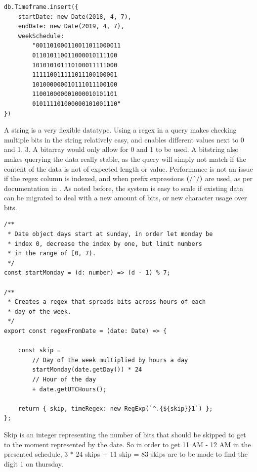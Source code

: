 \begin{center}
	\noindent\begin{minipage}{.45\textwidth}
		\begin{lstlisting}[caption={Improved timeframe.}, label={lst:new-timeframe}]
db.Timeframe.insert({
	startDate: new Date(2018, 4, 7),
	endDate: new Date(2019, 4, 7),
	weekSchedule:
		"001101000110011011000011
		011010110011000010111100
		101010101110100011111000
		111110011111011100100001
		101000000010111011100100
		110010000001000010101101
		010111101000000101001110"
})
\end{lstlisting}
	\end{minipage}
\end{center}

A string is a very flexible datatype. Using a regex in a query makes checking multiple bits in the string relatively easy, and enables different values next to 0 and 1. 3. A bitarray would only allow for 0 and 1 to be used. A bitstring also makes querying the data really stable, as the query will simply not match if the content of the data is not of expected length or value. Performance is not an issue if the regex column is indexed, and when prefix expressions $(/\string^/)$ are used, as per documentation in \cite{MongoDB-Regex}. As noted before, the system is easy to scale if existing data can be migrated to deal with a new amount of bits, or new character usage over bits.

\begin{lstlisting}[caption={Opening timeframe.}, label={lst:open-timeframe}]
/**
 * Date object days start at sunday, in order let monday be
 * index 0, decrease the index by one, but limit numbers
 * in the range of [0, 7).
 */
const startMonday = (d: number) => (d - 1) % 7;

/**
 * Creates a regex that spreads bits across hours of each
 * day of the week.
 */
export const regexFromDate = (date: Date) => {

	const skip =
		// Day of the week multiplied by hours a day
		startMonday(date.getDay()) * 24
		// Hour of the day
		+ date.getUTCHours();

	return { skip, timeRegex: new RegExp(`^.{${skip}}1`) };
};
\end{lstlisting}

Skip is an integer representing the number of bits that should be skipped to get to the moment represented by the date. So in order to get 11 AM - 12 AM in the presented schedule, 3 * 24 skips + 11 skip = 83 skips are to be made to find the digit 1 on thursday.

